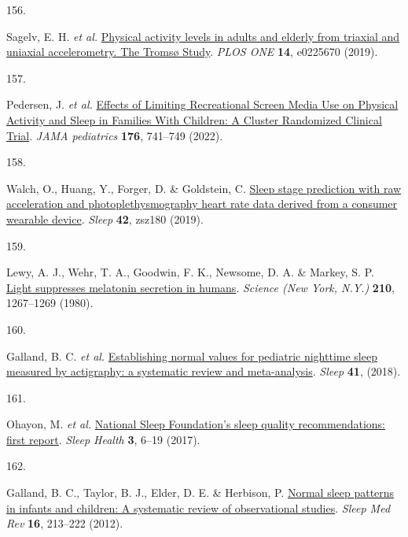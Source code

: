 \documentclass[
  10pt,
]{scrbook}
\newlength{\cslhangindent}
\newlength{\csllabelwidth}
\newlength{\cslentryspacingunit} %
\newenvironment{CSLReferences}[2] %
 {%
  \setlength{\parindent}{0pt}
  \ifodd #1
  \let\oldpar\par
  \def\par{\hangindent=\cslhangindent\oldpar}
  \fi
  \setlength{\parskip}{#2\cslentryspacingunit}
 }%
 {}
\newcommand{\CSLLeftMargin}[1]{\parbox[t]{\csllabelwidth}{#1}}
\newcommand{\CSLRightInline}[1]{\parbox[t]{\linewidth - \csllabelwidth}{#1}\break}
\let\originaltextbf\textbf
\renewcommand{\textbf}[1]{\textcolor{color1}{\textsf{\originaltextbf{#1}}}}
\begin{document}
\begin{CSLReferences}{0}{0}
\leavevmode{}%
\CSLLeftMargin{156. }%
\CSLRightInline{Sagelv, E. H. \emph{et al.}
\href{https://doi.org/10.1371/journal.pone.0225670}{Physical activity
levels in adults and elderly from triaxial and uniaxial accelerometry.
The Tromsø Study}. \emph{PLOS ONE} \textbf{14}, e0225670 (2019).}

\leavevmode{}%
\CSLLeftMargin{157. }%
\CSLRightInline{Pedersen, J. \emph{et al.}
\href{https://doi.org/10.1001/jamapediatrics.2022.1519}{Effects of
Limiting Recreational Screen Media Use on Physical Activity and Sleep in
Families With Children: A Cluster Randomized Clinical Trial}. \emph{JAMA
pediatrics} \textbf{176}, 741--749 (2022).}

\leavevmode{}%
\CSLLeftMargin{158. }%
\CSLRightInline{Walch, O., Huang, Y., Forger, D. \& Goldstein, C.
\href{https://doi.org/10.1093/sleep/zsz180}{Sleep stage prediction with
raw acceleration and photoplethysmography heart rate data derived from a
consumer wearable device}. \emph{Sleep} \textbf{42}, zsz180 (2019).}

\leavevmode{}%
\CSLLeftMargin{159. }%
\CSLRightInline{Lewy, A. J., Wehr, T. A., Goodwin, F. K., Newsome, D. A.
\& Markey, S. P. \href{https://doi.org/10.1126/science.7434030}{Light
suppresses melatonin secretion in humans}. \emph{Science (New York,
N.Y.)} \textbf{210}, 1267--1269 (1980).}

\leavevmode{}%
\CSLLeftMargin{160. }%
\CSLRightInline{Galland, B. C. \emph{et al.}
\href{https://doi.org/10.1093/sleep/zsy017}{Establishing normal values
for pediatric nighttime sleep measured by actigraphy: a systematic
review and meta-analysis}. \emph{Sleep} \textbf{41}, (2018).}

\leavevmode{}%
\CSLLeftMargin{161. }%
\CSLRightInline{Ohayon, M. \emph{et al.}
\href{https://doi.org/10.1016/j.sleh.2016.11.006}{National Sleep
Foundation's sleep quality recommendations: first report}. \emph{Sleep
Health} \textbf{3}, 6--19 (2017).}

\leavevmode{}%
\CSLLeftMargin{162. }%
\CSLRightInline{Galland, B. C., Taylor, B. J., Elder, D. E. \& Herbison,
P. \href{https://doi.org/10.1016/j.smrv.2011.06.001}{Normal sleep
patterns in infants and children: A systematic review of observational
studies}. \emph{Sleep Med Rev} \textbf{16}, 213--222 (2012).}


\end{CSLReferences}
\end{document}
